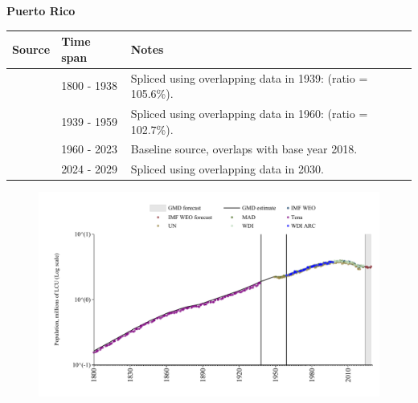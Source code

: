 \documentclass[12pt,a4paper,landscape]{article}
\begin{document}
\begin{adjustbox}{max totalsize={\paperwidth}{\paperheight},center}
\begin{minipage}[t][\textheight][t]{\textwidth}
\vspace*{0.5cm}
{}
\begin{center}
{\Large\bfseries Puerto Rico}
\end{center}
\vspace{0.5cm}
\begin{table}[H]
\centering
\small
\begin{tabular}{|l|l|l|}
\hline
\textbf{Source} & \textbf{Time span} & \textbf{Notes} \\
\hline
\rowcolor{white}\cite{Tena}& 1800 - 1938 &Spliced using overlapping data in 1939: (ratio = 105.6\%).\\
\rowcolor{lightgray}\cite{UN}& 1939 - 1959 &Spliced using overlapping data in 1960: (ratio = 102.7\%).\\
\rowcolor{white}\cite{WDI}& 1960 - 2023 &Baseline source, overlaps with base year 2018.\\
\rowcolor{lightgray}\cite{IMF_WEO_forecast}& 2024 - 2029 &Spliced using overlapping data in 2030.\\
\hline
\end{tabular}
\end{table}
\begin{figure}[H]
\centering
\includegraphics[width=\textwidth,height=0.6\textheight,keepaspectratio]{graphs/PRI_pop.pdf}
\end{figure}
\end{minipage}
\end{adjustbox}
\end{document}
